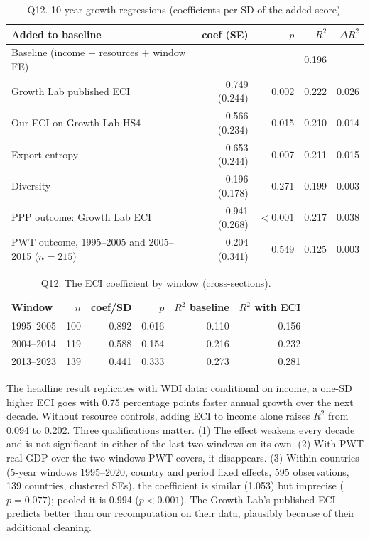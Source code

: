 \documentclass[11pt]{article}
\begin{document}
\begin{table}[H]\centering\small
\caption{Q12. 10-year growth regressions (coefficients per SD of the added score).}\label{tab:q12}
\begin{tabular}{lrrrr}
\toprule
Added to baseline & coef (SE) & $p$ & $R^2$ & $\Delta R^2$ \\
\midrule
Baseline (income + resources + window FE) & & & 0.196 & \\
Growth Lab published ECI & 0.749 (0.244) & 0.002 & 0.222 & 0.026 \\
Our ECI on Growth Lab HS4 & 0.566 (0.234) & 0.015 & 0.210 & 0.014 \\
Export entropy & 0.653 (0.244) & 0.007 & 0.211 & 0.015 \\
Diversity & 0.196 (0.178) & 0.271 & 0.199 & 0.003 \\
\midrule
PPP outcome: Growth Lab ECI & 0.941 (0.268) & $<0.001$ & 0.217 & 0.038 \\
PWT outcome, 1995--2005 and 2005--2015 ($n=215$) & 0.204 (0.341) & 0.549 & 0.125 & 0.003 \\
\bottomrule
\end{tabular}
\end{table}

\begin{table}[H]\centering\small
\caption{Q12. The ECI coefficient by window (cross-sections).}\label{tab:q12b}
\begin{tabular}{lrrrrr}
\toprule
Window & $n$ & coef/SD & $p$ & $R^2$ baseline & $R^2$ with ECI \\
\midrule
1995--2005 & 100 & 0.892 & 0.016 & 0.110 & 0.156 \\
2004--2014 & 119 & 0.588 & 0.154 & 0.216 & 0.232 \\
2013--2023 & 139 & 0.441 & 0.333 & 0.273 & 0.281 \\
\bottomrule
\end{tabular}
\end{table}

The headline result replicates with WDI data: conditional on income, a one-SD higher ECI goes with 0.75 percentage points faster annual growth over the next decade. Without resource controls, adding ECI to income alone raises $R^2$ from 0.094 to 0.202. Three qualifications matter. (1) The effect weakens every decade and is not significant in either of the last two windows on its own. (2) With PWT real GDP over the two windows PWT covers, it disappears. (3) Within countries (5-year windows 1995--2020, country and period fixed effects, 595 observations, 139 countries, clustered SEs), the coefficient is similar (1.053) but imprecise ($p=0.077$); pooled it is 0.994 ($p<0.001$). The Growth Lab's published ECI predicts better than our recomputation on their data, plausibly because of their additional cleaning.
\end{document}

